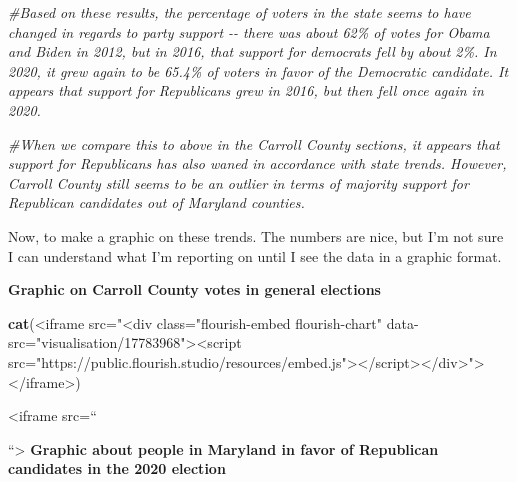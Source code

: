 \documentclass[
]{article}
\newenvironment{Shaded}{\begin{snugshade}}{\end{snugshade}}
\newcommand{\CommentTok}[1]{\textcolor[rgb]{0.56,0.35,0.01}{\textit{#1}}}
\newcommand{\FunctionTok}[1]{\textcolor[rgb]{0.13,0.29,0.53}{\textbf{#1}}}
\newcommand{\NormalTok}[1]{#1}
\newcommand{\StringTok}[1]{\textcolor[rgb]{0.31,0.60,0.02}{#1}}
\begin{document}
\begin{Shaded}
\begin{Highlighting}[]
\CommentTok{\#Based on these results, the percentage of voters in the state seems to have changed in regards to party support {-}{-} there was about 62\% of votes for Obama and Biden in 2012, but in 2016, that support for democrats fell by about 2\%. In 2020, it grew again to be 65.4\% of voters in favor of the Democratic candidate. It appears that support for Republicans grew in 2016, but then fell once again in 2020. }

\CommentTok{\#When we compare this to above in the Carroll County sections, it appears that support for Republicans has also waned in accordance with state trends. However, Carroll County still seems to be an outlier in terms of majority support for Republican candidates out of Maryland counties.}
\end{Highlighting}
\end{Shaded}

Now, to make a graphic on these trends. The numbers are nice, but I'm
not sure I can understand what I'm reporting on until I see the data in
a graphic format.

\textbf{Graphic on Carroll County votes in general elections}

\begin{Shaded}
\begin{Highlighting}[]
\FunctionTok{cat}\NormalTok{(}\StringTok{\textquotesingle{}\textless{}iframe src="\textless{}div class="flourish{-}embed flourish{-}chart" data{-}src="visualisation/17783968"\textgreater{}\textless{}script src="https://public.flourish.studio/resources/embed.js"\textgreater{}\textless{}/script\textgreater{}\textless{}/div\textgreater{}"\textgreater{}\textless{}/iframe\textgreater{}\textquotesingle{}}\NormalTok{)}
\end{Highlighting}
\end{Shaded}

\textless iframe src=``

``\textgreater{} \textbf{Graphic about people in Maryland in favor of
Republican candidates in the 2020 election}
\end{document}
